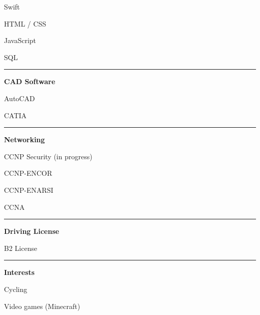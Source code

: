 \documentclass[a4paper]{letter}
\newcommand{\divider}{\rule{\linewidth}{0.9pt}}
\begin{document}
\begin{minipage}[t]{0.30\textwidth}
\faCircleNotch \quad Swift

\faCircleNotch \quad HTML / CSS

\faCircleNotch \quad JavaScript

\faCircleNotch \quad SQL

\divider


{\large \textbf{CAD Software}}

\faCircleNotch \quad AutoCAD

\faCircleNotch \quad CATIA

\divider


{\large \textbf{Networking}}

\faNetworkWired \quad CCNP Security (in progress)

\faNetworkWired \quad CCNP-ENCOR

\faNetworkWired \quad CCNP-ENARSI

\faNetworkWired \quad CCNA

\divider


{\large \textbf{Driving License}}

\faCar \quad B2 License

\divider


{\large \textbf{Interests}}

\faBicycle \quad Cycling

\faGamepad \quad Video games (Minecraft)



\end{minipage}
\hspace{2mm}
\end{document}
